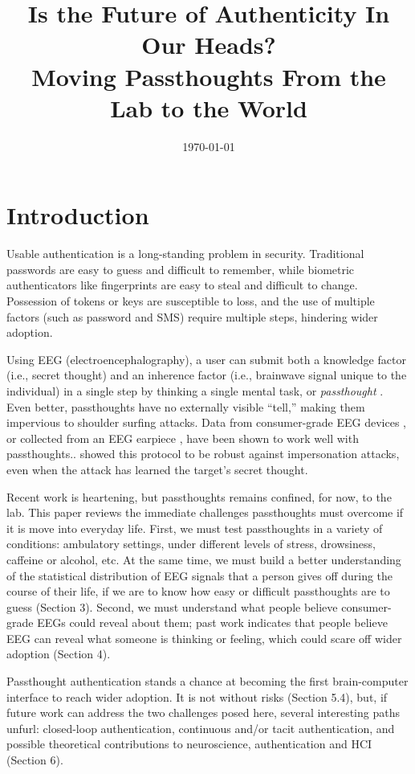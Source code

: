 \documentclass[sigconf]{acmart}
\date{\today}
\title{Is the Future of Authenticity In Our Heads?\\\medskip
\large Moving Passthoughts From the Lab to the World}
\begin{document}
\maketitle

\section{Introduction}
\label{sec:org0211b52}

Usable authentication is a long-standing problem in security.
Traditional passwords are easy to guess and difficult to remember,
while biometric authenticators like fingerprints are easy to steal and difficult to change.
Possession of tokens or keys are susceptible to loss, 
and the use of multiple factors (such as password and SMS) require multiple steps, hindering wider adoption.

Using EEG (electroencephalography), a user can submit both a knowledge factor (i.e., secret thought) and an inherence factor (i.e., brainwave signal unique to the individual) in a single step by thinking a single mental task, or \emph{passthought} \cite{Thorpe2005}.
Even better, passthoughts have no externally visible ``tell,'' making them impervious to shoulder surfing attacks.
Data from consumer-grade EEG devices \cite{Chuang2013b}, 
or collected from an EEG earpiece \cite{curranpassthoughts},
have been shown to work well with passthoughts..
\cite{Johnson2014} showed this protocol to be robust against impersonation attacks, even when the attack has learned the target's secret thought.

Recent work is heartening, but passthoughts remains confined, for now, to the lab.
This paper reviews the immediate challenges passthoughts must overcome if it is move into everyday life.
First, we must test passthoughts in a variety of conditions: ambulatory settings, under different levels of stress, drowsiness, caffeine or alcohol, etc.
At the same time, we must build a better understanding of the statistical distribution of EEG signals that a person gives off during the course of their life, if we are to know how easy or difficult passthoughts are to guess (Section 3).
Second, we must understand what people believe consumer-grade EEGs could reveal about them; 
past work indicates that people believe EEG can reveal what someone is thinking or feeling, which could scare off wider adoption (Section 4).

Passthought authentication stands a chance at becoming the first brain-computer interface to reach wider adoption. It is not without risks (Section 5.4),
but, if future work can address the two challenges posed here, several interesting paths unfurl:
closed-loop authentication, 
continuous and/or tacit authentication, 
and possible theoretical contributions to neuroscience, authentication and HCI (Section 6).
\end{document}
